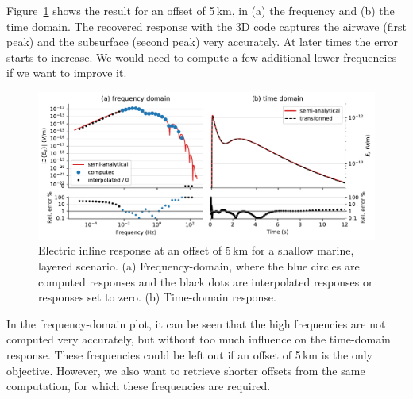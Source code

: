 \documentclass[onecolumn,extra,referee,camera]{gji}
\newlength{\fwidth}
\begin{document}
Figure~\ref{fig:marine} shows the result for an offset of 5\,km, in (a) the
frequency and (b) the time domain. The recovered response with the 3D code
captures the airwave (first peak) and the subsurface (second peak) very
accurately. At later times the error starts to increase. We would need to
compute a few additional lower frequencies if we want to improve it.
%
\begin{figure}
  \centering
  \includegraphics[width=\fwidth]{06-marine}
  \caption{Electric inline response at an offset of 5\,km for a shallow marine,
    layered scenario. (a) Frequency-domain, where the blue circles are computed
    responses and the black dots are interpolated responses or responses set to
    zero. (b) Time-domain response.}
  \label{fig:marine}
\end{figure}
%
In the frequency-domain plot, it can be seen that the high frequencies are not
computed very accurately, but without too much influence on the time-domain
response. These frequencies could be left out if an offset of 5\,km is the only
objective. However, we also want to retrieve shorter offsets from the same
computation, for which these frequencies are required.
\end{document}

